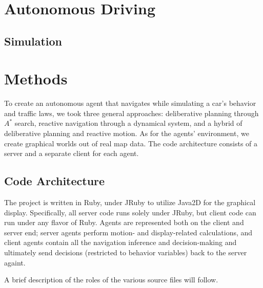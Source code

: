 \documentclass{article}
\begin{document}
\section{Autonomous Driving}

\subsection{Simulation}

\section{Methods}

To create an autonomous agent that navigates while simulating a car's behavior
and traffic laws, we took three general approaches: deliberative planning
through $A^*$ search, reactive navigation through a dynamical system, and a
hybrid of deliberative planning and reactive motion. As for the agents'
environment, we create graphical worlds out of real map data. The code
architecture consists of a server and a separate client for each agent.

\subsection{Code Architecture}

The project is written in Ruby, under JRuby to utilize Java2D for the graphical
display. Specifically, all server code runs solely under JRuby, but client
code can run under any flavor of Ruby. Agents are represented both on the client
and server end; server agents perform motion- and display-related
calculations, and client agents contain all the navigation inference and
decision-making and ultimately send decisions (restricted to behavior variables)
back to the server againt.

A brief description of the roles of the various source files will follow.
\end{document}
